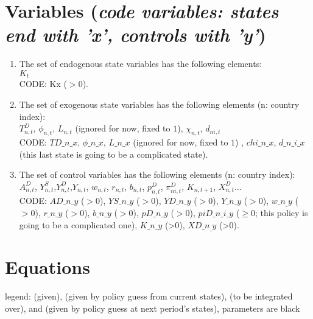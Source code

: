 \documentclass[11pt]{article}
\newcommand{\cl}[1]{{\color{orange}{#1}}}
\newcommand{\st}[1]{{\color{green}{#1}}}
\newcommand{\stnext}[1]{{\color{magenta}{#1}}}
\newcommand{\clnext}[1]{{\color{blue}{#1}}}
\begin{document}

\section{Variables (\emph{code variables: states end with 'x', controls with 'y'})}

\begin{enumerate}
	\item The set of endogenous state variables has the following elements: \\
	 $K_t$\\
	 CODE: Kx ($>0$).
	\item The set of exogenous state variables has the following elements (n: country index): \\
	 $T^D_{n,t}$, $\phi_{n,t}$, $L_{n,t}$ (ignored for now, fixed to $1$),  $\chi_{n,t}$, $d_{ni,t}$ \\
	 CODE: $TD\_n\_x$, $\phi\_n\_x$, $L\_n\_x$ (ignored for now, fixed to $1$) , $chi\_n\_x$, $d\_n\_i\_x$ (this last state is going to be a complicated state). \\
	 \item The set of control variables has the following elements (n: country index): \\
	 $A_{n, t}^{D}$, $Y^S_{n,t}$,$Y^D_{n,t}$,$Y_{n,t}$, $w_{n,t}$, $r_{n,t}$, $b_{n,t}$, $p^D_{n,t}$, $\pi^D_{ni,t}$, $K_{n,t+1}$, $X^D_{n,t}$...\\
	 CODE: $AD\_n\_y$ ($>0$), $YS\_n\_y$ ($>0$), $YD\_n\_y$ ($>0$), $Y\_n\_y$ ($>0$), 
	 $w\_n_\_y$ ($>0$), $r\_n\_y$ ($>0$), $b\_n\_y$ ($>0$), $pD\_n\_y$ ($>0$), $piD\_n\_i\_y$ ($\geq 0$; this policy is going to be a complicated one), $K\_n\_y$ (>0), $XD\_n_\_y$ (>0). \\
\end{enumerate}



\section{Equations}

legend: \st{states in green} (given), \cl{controls in orange} (given by policy guess from current states), \stnext{next period's exogenous states in magenta} (to be integrated over), and \clnext{next period's controls in blue} (given by policy guess at next period's states), parameters are black\vspace{5mm}
\end{document}
